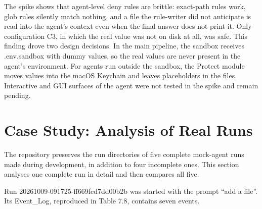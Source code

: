 \documentclass[12pt,a4paper,oneside]{report}
\begin{document}
\endgroup

The spike shows that agent-level deny rules are brittle: exact-path rules work, glob rules silently match nothing, and a file the rule-writer did not anticipate is read into the agent's context even when the final answer does not print it. Only configuration C3, in which the real value was not on disk at all, was safe. This finding drove two design decisions. In the main pipeline, the sandbox receives .env.sandbox with dummy values, so the real values are never present in the agent's environment. For agents run outside the sandbox, the Protect module moves values into the macOS Keychain and leaves placeholders in the files. Interactive and GUI surfaces of the agent were not tested in the spike and remain pending.

\section{Case Study: Analysis of Real Runs}\label{case-study-analysis-of-real-runs}

The repository preserves the run directories of five complete mock-agent runs made during development, in addition to four incomplete ones. This section analyses one complete run in detail and then compares all five.

Run 20261009-091725-ff669fcd7dd00b2b was started with the prompt ``add a file''. Its Event\_Log, reproduced in Table 7.8, contains seven events.
\end{document}
